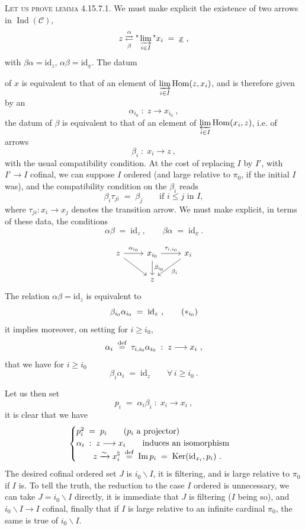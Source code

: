 \documentclass[11pt]{article}
\newcommand{\printedpage}[1]{\marginpar{\footnotesize p.~#1}}
\newcommand{\msp}[1]{\marginpar{\footnotesize [#1]}}
\newcommand{\ux}{\underline{x}}
\newcommand{\cC}{\mathcal{C}}
\newcommand{\id}{\mathrm{id}}
\newcommand{\Hom}{\operatorname{Hom}}
\newcommand{\Ind}{\operatorname{Ind}}
\newcommand{\Img}{\operatorname{Im}}
\newcommand{\Ker}{\operatorname{Ker}}
\newcommand{\defeq}{\overset{\text{\upshape def}}{=}}
\begin{document}
\textsc{Let us prove lemma} 4.15.7.1. We must make explicit the existence of two arrows in $\Ind(\cC)$,
\[
z \underset{\beta}{\overset{\alpha}{\rightleftarrows}} \text{"}\varinjlim_{i\in I}\text{"} x_i \;=\; \ux\ ,
\]
with $\beta\alpha = \id_z$, $\alpha\beta = \id_{\ux}$. The datum

\msp{page 449}
of $x$ is equivalent to that of an element of $\varinjlim\limits_{i\in I} \Hom(z,x_i)$, and is therefore given by an %
\[
\alpha_{i_0} \;:\; z \longrightarrow x_{i_0}\ ,
\]
the datum of $\beta$ is equivalent to that of an element of $\varprojlim\limits_{i\in I} \Hom(x_i,z)$, i.e. of arrows
\[
\beta_i \;:\; x_i \longrightarrow z\ ,
\]
with the usual compatibility condition. At the cost of replacing $I$ by $I'$, with $I' \longrightarrow I$ cofinal, we can suppose $I$ ordered (and large relative to $\pi_0$, if the initial $I$ was), and the compatibility condition on the $\beta_i$ reads
\[
\beta_i\tau_{ji} \;=\; \beta_j \qquad \text{if } i \leqslant j \text{ in } I,
\]
where $\tau_{ji} : x_i \longrightarrow x_j$ denotes the transition arrow. We must make explicit, in terms of these data, the conditions
\[
\alpha\beta \;=\; \id_z\ , \qquad \beta\alpha \;=\; \id_{\ux}\ .
\]

\printedpage{173}
\[
\begin{tikzcd}
z \arrow[r, "\alpha_{i_0}"] \arrow[dr] & x_{i_0} \arrow[r, "\tau_{i,i_0}"] \arrow[d, "\beta_{i_0}"] & x_i \arrow[dl, "\beta_i"] \\
 & z &
\end{tikzcd}
\]
The relation $\alpha\beta = \id_z$ is equivalent to
\[
\beta_{i_0}\alpha_{i_0} \;=\; \id_z\ , \tag*{$(*_{i_0})$}
\]
it implies moreover, on setting for $i \geqslant i_0$,
\[
\alpha_i \;\defeq\; \tau_{i,i_0}\alpha_{i_0} \;:\; z \longrightarrow x_i\ ,
\]
that we have for $i \geqslant i_0$
\[
\beta_i\alpha_i \;=\; \id_z \qquad \forall\, i \geqslant i_0\ . \tag*{$(*_i)$}
\]

\msp{page 450}
Let us then set
\[
p_i \;=\; \alpha_i\beta_i \;:\; x_i \longrightarrow x_i\ ,
\]
it is clear that we have
\[
\begin{cases}
p_i^2 \;=\; p_i \qquad \text{($p_i$ a projector)} \\
\alpha_i \;:\; z \longrightarrow x_i \qquad \text{induces an isomorphism} \\
\qquad z \xrightarrow{\sim} x_i^\natural \;\defeq\; \Img p_i \;=\; \Ker(\id_{x_i},p_i)\ .
\end{cases}
\]
The desired cofinal ordered set $J$ is $i_0\backslash I$, it is filtering, and is large relative to $\pi_0$ if $I$ is. To tell the truth, the reduction to the case $I$ ordered is unnecessary, we can take $J = i_0\backslash I$ directly, it is immediate that $J$ is filtering ($I$ being so), and $i_0\backslash I \longrightarrow I$ cofinal, finally that if $I$ is large relative to an infinite cardinal $\pi_0$, the same is true of $i_0\backslash I$.
\end{document}
